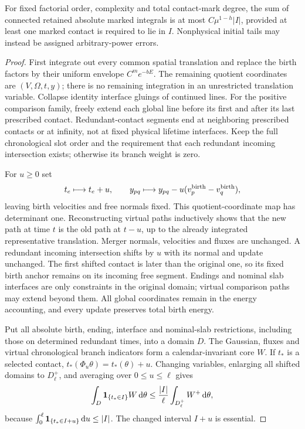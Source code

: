 \begin{lemma}\label{lem:calendar}
For fixed factorial order, complexity and total contact-mark degree, the
sum of connected retained absolute marked integrals is at most
$C\mu^{1-h}|I|$, provided at least one marked contact is required to lie
in $I$. Nonphysical initial tails may instead be assigned arbitrary-power
errors.
\end{lemma}
\begin{proof}
First integrate out every common spatial translation and replace the
birth factors by their uniform envelope $C^m e^{-bE}$.
The remaining quotient coordinates are $(V,\Omega,t,y)$; there is no
remaining integration in an unrestricted translation variable.
Collapse identity interface gluings of continued lines.
For the positive comparison family, freely extend each global line
before its first and after its last prescribed contact. Redundant-contact
segments end at neighboring prescribed contacts or at infinity, not at
fixed physical lifetime interfaces. Keep the full chronological slot
order and the requirement that each redundant incoming intersection
exists; otherwise its branch weight is zero.

For $u\geq0$ set
\[
 t_e\longmapsto t_e+u,\qquad
 y_{pq}\longmapsto y_{pq}-u(v_p^{\rm birth}-v_q^{\rm birth}),
\]
leaving birth velocities and free normals fixed.
This quotient-coordinate map has determinant one. Reconstructing virtual
paths inductively shows that the new path at time $t$ is the old path at
$t-u$, up to the already integrated representative translation.
Merger normals, velocities and fluxes are unchanged. A redundant
incoming intersection shifts by $u$ with its normal and update unchanged.
The first shifted contact is later than the original one, so its fixed
birth anchor remains on its incoming free segment.
Endings and nominal slab interfaces are only constraints in the original
domain; virtual comparison paths may extend beyond them.
All global coordinates remain in the energy accounting, and every update
preserves total birth energy.

Put all absolute birth, ending, interface and nominal-slab restrictions,
including those on determined redundant times, into a domain $D$.
The Gaussian, fluxes and virtual chronological branch indicators form
a calendar-invariant core $W$.
If $t_*$ is a selected contact, $t_*(\Phi_u\theta)=t_*(\theta)+u$.
Changing variables, enlarging all shifted domains to $D_\ell^+$, and
averaging over $0\leq u\leq\ell$ gives
\begin{equation}\label{eq:calendar-average}
 \int_D\mathbf1_{\{t_*\in I\}}W\,\mathrm d\theta
 \leq\frac{|I|}{\ell}\int_{D_\ell^+}W^+\,\mathrm d\theta ,
\end{equation}
because $\int_0^\ell\mathbf1_{\{t_*\in I+u\}}\,\mathrm d u\leq|I|$.
The changed interval $I+u$ is essential.


\end{proof}
